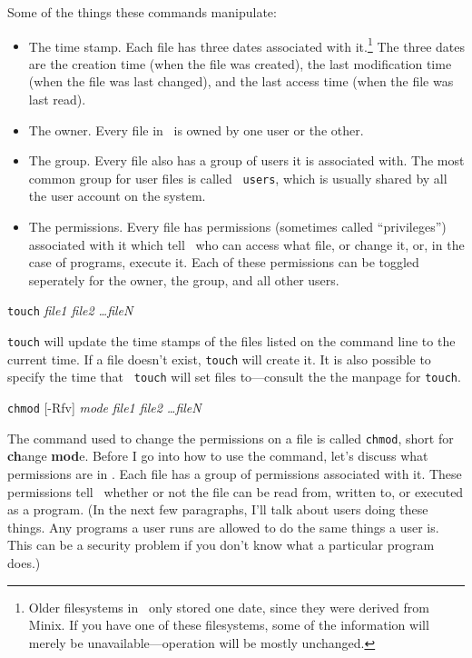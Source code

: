 Some of the things these commands manipulate:
\begin{itemize}
\item The time stamp. Each file has three dates
  associated with it.\footnote{Older filesystems in \linux\ only
    stored one date, since they were derived from Minix. If you have
    one of these filesystems, some of the information will merely be
    unavailable---operation will be mostly unchanged.} The three dates
  are the creation time (when the file was created), the last
  modification time (when the file was last changed), and the last
  access time (when the file was last read).
\item The owner. Every file in \unix\ is owned by one user or the
  other.
\item The group.  Every file also has a group of users it is
  associated with. The most common group for user files is called {\tt
    users}, which is usually shared by all the user account on the
  system.
\item The permissions. Every file has permissions
  (sometimes called ``privileges'') associated with it
  which tell \unix\ who can access what file, or change it, or, in the
  case of programs, execute it. Each of these permissions can be
  toggled seperately for the owner, the group, and all other users.
\end{itemize}

\begin{command}
  {\tt touch} {\sl file1 file2 \ldots fileN}
\end{command}

{\tt touch} will update the time stamps of the files listed on the
command line to the current time. If a file doesn't exist, {\tt touch}
will create it.  It is also possible to specify the time that {\tt
  touch} will set files to---consult the the manpage for {\tt touch}.

\begin{command}
{\tt chmod} [-Rfv] {\sl mode} {\sl file1 file2 \ldots fileN}
\end{command}

 The command used to change the permissions
on a file is called {\tt chmod}, short for {\bf ch}ange {\bf mod}e.
Before I go into how to use the command, let's discuss what
permissions are in \unix. Each file has a group of permissions
associated with it.  These permissions tell \unix\ whether or not the
file can be read from, written to, or executed as a program. (In the
next few paragraphs, I'll talk about users doing these things.  Any
programs a user runs are allowed to do the same things a user is. This
can be a security problem if you don't know what a particular program
does.)

